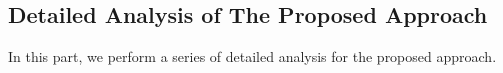 


\subsection{Detailed Analysis of The Proposed Approach}
In this part, we perform a series of detailed analysis for the proposed approach.


